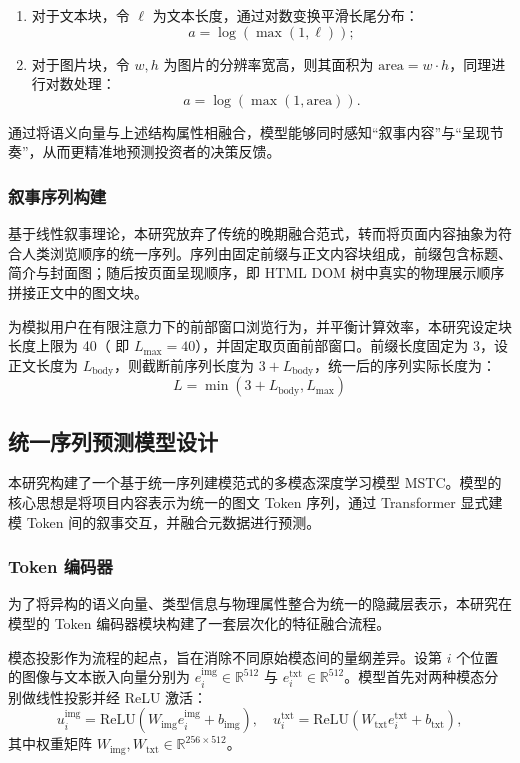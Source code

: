\begin{enumerate}[label=(\arabic*)]
  \item 对于文本块，令 $ \ell $ 为文本长度，通过对数变换平滑长尾分布：
  \begin{equation}
  a=\log(\max(1,\ell));
  \end{equation}
  \item 对于图片块，令 $ w,h $ 为图片的分辨率宽高，则其面积为 $ \text{area}=w\cdot h $，同理进行对数处理：
  \begin{equation}
  a=\log(\max(1,\text{area})).
  \end{equation}
\end{enumerate}


通过将语义向量与上述结构属性相融合，模型能够同时感知“叙事内容”与“呈现节奏”，从而更精准地预测投资者的决策反馈。

\subsubsection{叙事序列构建}
基于线性叙事理论，本研究放弃了传统的晚期融合范式，转而将页面内容抽象为符合人类浏览顺序的统一序列。序列由固定前缀与正文内容块组成，前缀包含标题、简介与封面图；随后按页面呈现顺序，即 HTML DOM 树中真实的物理展示顺序拼接正文中的图文块。

为模拟用户在有限注意力下的前部窗口浏览行为，并平衡计算效率，本研究设定块长度上限为 40（ 即 $ L_{\max}=40 $），并固定取页面前部窗口。前缀长度固定为 3，设正文长度为 $ L_{\text{body}} $，则截断前序列长度为 $ 3+L_{\text{body}} $，统一后的序列实际长度为：
\begin{equation}
L=\min(3+L_{\text{body}},L_{\max})
\end{equation}
\subsection{统一序列预测模型设计}
本研究构建了一个基于统一序列建模范式的多模态深度学习模型 MSTC。模型的核心思想是将项目内容表示为统一的图文 Token 序列，通过 Transformer 显式建模 Token 间的叙事交互，并融合元数据进行预测。

\subsubsection{Token 编码器}
为了将异构的语义向量、类型信息与物理属性整合为统一的隐藏层表示，本研究在模型的 Token 编码器模块构建了一套层次化的特征融合流程。

模态投影作为流程的起点，旨在消除不同原始模态间的量纲差异。设第 $ i $ 个位置的图像与文本嵌入向量分别为 $ e_i^{\text{img}}\in\mathbb{R}^{512} $ 与 $ e_i^{\text{txt}}\in\mathbb{R}^{512} $。模型首先对两种模态分别做线性投影并经 ReLU 激活：
\begin{equation}
u_i^{\text{img}}=\text{ReLU}(W_{\text{img}}e_i^{\text{img}}+b_{\text{img}}),\quad
u_i^{\text{txt}}=\text{ReLU}(W_{\text{txt}}e_i^{\text{txt}}+b_{\text{txt}}),
\end{equation}
其中权重矩阵 $ W_{\text{img}},W_{\text{txt}}\in\mathbb{R}^{256\times 512} $。

